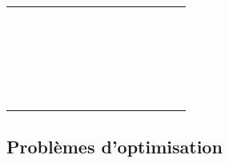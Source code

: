 			\begin{center}
				\tablefirsthead{}
				\tablehead{}
				\tabletail{}
				\tablelasttail{}
				\begin{supertabular}{m{0.93900007cm}|m{0.81600004cm}|m{0.81600004cm}|m{0.81600004cm}|m{0.81600004cm}|m{0.81600004cm}|m{0.541cm}m{0.731cm}m{1.176cm}|m{0.81600004cm}|m{0.81600004cm}|m{0.81600004cm}|m{0.81600004cm}|m{0.83400005cm}|}
				\hhline{~-----~~~-----}
				~
				 &
				 &
				 &
				 &
				 &
				 &
				~
				 &
				~
				 &
				~
				 &
				 &
				 &
				 &
				 &
				\centering{}\\\hhline{~-----~~~-----}
				~
				 &
				 &
				 &
				 &
				 &
				 &
				~
				 &
				~
				 &
				~
				 &
				 &
				 &
				 &
				 &
				\centering{}\\\hhline{~-----~~~-----}
				 &
				 &
				 &
				 &
				 &
				 &
				~
				 &
				~
				 &
				 &
				 &
				 &
				 &
				 &
				\centering{}\\\hhline{~-----~~~-----}
				~
				 &
				 &
				 &
				 &
				 &
				 &
				~
				 &
				~
				 &
				~
				 &
				 &
				 &
				 &
				 &
				\centering{}\\\hhline{~-----~~~-----}
				~
				 &
				 &
				 &
				 &
				 &
				 &
				~
				 &
				~
				 &
				~
				 &
				 &
				 &
				 &
				 &
				\centering{}\\\hhline{~-----~~~-----}
				\end{supertabular}
			\end{center}
	
	\subsection{Problèmes d'optimisation}
				

